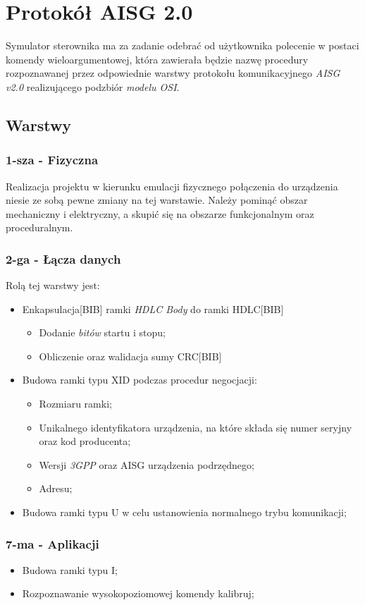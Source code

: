 \chapter{Protokół AISG 2.0}
	Symulator sterownika ma za zadanie odebrać od użytkownika polecenie w postaci komendy wieloargumentowej, 
	która zawierała będzie nazwę procedury rozpoznawanej przez odpowiednie warstwy protokołu komunikacyjnego \textit{AISG v2.0}
	realizującego podzbiór \textit{modelu OSI}.
	
	\section{Warstwy}
		\subsection{1-sza - Fizyczna}
		Realizacja projektu w kierunku emulacji fizycznego połączenia do urządzenia niesie ze sobą pewne zmiany na tej warstawie.\newline
		Należy pominąć obszar mechaniczny i elektryczny, a skupić się na obszarze funkcjonalnym oraz proceduralnym.
		\subsection{2-ga - Łącza danych}
		Rolą tej warstwy jest:
		\begin{itemize}
			\item Enkapsulacja[BIB] ramki \textit{HDLC Body} do ramki HDLC[BIB]
			\begin{itemize}
				\item Dodanie \textit{bitów} startu i stopu;
				\item Obliczenie oraz walidacja sumy CRC[BIB]
			\end{itemize}
			\item Budowa ramki typu XID podczas procedur negocjacji:
			\begin{itemize}
				\item Rozmiaru ramki;
				\item Unikalnego identyfikatora urządzenia, na które składa się numer seryjny oraz kod producenta;
				\item Wersji \textit{3GPP} oraz AISG urządzenia podrzędnego;
				\item Adresu;
			\end{itemize}
			\item Budowa ramki typu U w celu ustanowienia normalnego trybu komunikacji;
		\end{itemize}
		\subsection{7-ma - Aplikacji}
			\begin{itemize}
				\item Budowa ramki typu I;
				\item Rozpoznawanie wysokopoziomowej komendy kalibruj;
			\end{itemize}